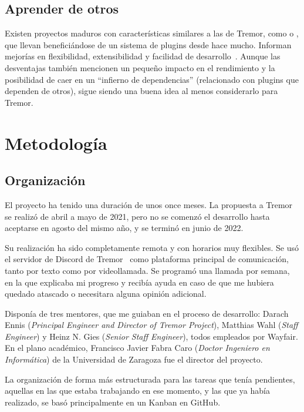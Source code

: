 \subsection{Aprender de otros}

Existen proyectos maduros con características similares a las de Tremor, como
 o , que llevan beneficiándose de un
sistema de plugins desde hace mucho. Informan mejorías en flexibilidad,
extensibilidad y facilidad de
desarrollo~\cite{nginxPluginsAdvantages}\cite{apachePluginsAdvantages}. Aunque
las desventajas también mencionen un pequeño impacto en el rendimiento y la
posibilidad de caer en un ``infierno de dependencias'' (relacionado con plugins
que dependen de otros), sigue siendo una buena idea al menos considerarlo para
Tremor.

\section{Metodología}

\subsection{Organización}

El proyecto ha tenido una duración de unos once meses. La propuesta a Tremor se
realizó de abril a mayo de 2021, pero no se comenzó el desarrollo hasta
aceptarse en agosto del mismo año, y se terminó en junio de 2022.

Su realización ha sido completamente remota y con horarios muy flexibles. Se usó
el servidor de Discord de Tremor~\cite{tremor_discord} como plataforma principal
de comunicación, tanto por texto como por videollamada. Se programó una llamada
por semana, en la que explicaba mi progreso y recibía ayuda en caso de que me
hubiera quedado atascado o necesitara alguna opinión adicional.

Disponía de tres mentores, que me guiaban en el proceso de desarrollo: Darach
Ennis (\emph{Principal Engineer and Director of Tremor Project}), Matthias Wahl
(\emph{Staff Engineer}) y Heinz N. Gies (\emph{Senior Staff Engineer}), todos
empleados por Wayfair. En el plano académico, Francisco Javier Fabra Caro
(\emph{Doctor Ingeniero en Informática}) de la Universidad de Zaragoza fue el
director del proyecto.

La organización de forma más estructurada para las tareas que tenía pendientes,
aquellas en las que estaba trabajando en ese momento, y las que ya había
realizado, se basó principalmente en un Kanban en GitHub.

